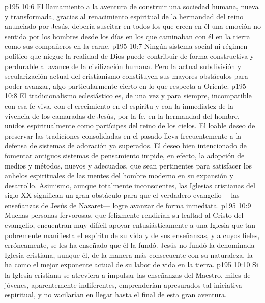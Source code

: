 \vs p195 10:6 El llamamiento a la aventura de construir una sociedad humana, nueva y transformada, gracias al renacimiento espiritual de la hermandad del reino anunciado por Jesús, debería suscitar en todos los que creen en él una emoción no sentida por los hombres desde los días en los que caminaban con él en la tierra como sus compañeros en la carne.
\vs p195 10:7 Ningún sistema social ni régimen político que niegue la realidad de Dios puede contribuir de forma constructiva y perdurable al avance de la civilización humana. Pero la actual subdivisión y secularización actual del cristianismo constituyen sus mayores obstáculos para poder avanzar, algo particularmente cierto en lo que respecta a Oriente.
\vs p195 10:8 \pc El tradicionalismo eclesiástico es, de una vez y para siempre, incompatible con esa fe viva, con el crecimiento en el espíritu y con la inmediatez de la vivencia de los camaradas de Jesús, por la fe, en la hermandad del hombre, unidos espiritualmente como partícipes del reino de los cielos. El loable deseo de preservar las tradiciones consolidadas en el pasado lleva frecuentemente a la defensa de sistemas de adoración ya superados. El deseo bien intencionado de fomentar antiguos sistemas de pensamiento impide, en efecto, la adopción de medios y métodos, nuevos y adecuados, que sean pertinentes para satisfacer los anhelos espirituales de las mentes del hombre moderno en su expansión y desarrollo. Asimismo, aunque totalmente inconscientes, las Iglesias cristianas del siglo XX significan un gran obstáculo para que el verdadero evangelio ---las enseñanzas de Jesús de Nazaret--- logre avanzar de forma inmediata.
\vs p195 10:9 Muchas personas fervorosas, que felizmente rendirían su lealtad al Cristo del evangelio, encuentran muy difícil apoyar entusiásticamente a una Iglesia que tan pobremente manifiesta el espíritu de su vida y de sus enseñanzas, y a cuyos fieles, erróneamente, se les ha enseñado que él la fundó. Jesús no fundó la denominada Iglesia cristiana, aunque él, de la manera más consecuente con su naturaleza, la ha  como el mejor exponente actual de su labor de vida en la tierra.
\vs p195 10:10 Si la Iglesia cristiana se atreviera a impulsar las enseñanzas del Maestro, miles de jóvenes, aparentemente indiferentes, emprenderían apresurados tal iniciativa espiritual, y no vacilarían en llegar hasta el final de esta gran aventura.
